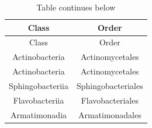 \documentclass[]{article}
\begin{document}
\begin{longtable}[]{@{}cc@{}}
\caption{Table continues below}\tabularnewline
\toprule
\begin{minipage}[b]{0.38\columnwidth}\centering\strut
Class\strut
\end{minipage} & \begin{minipage}[b]{0.44\columnwidth}\centering\strut
Order\strut
\end{minipage}\tabularnewline
\midrule
\endfirsthead
\toprule
\begin{minipage}[b]{0.38\columnwidth}\centering\strut
Class\strut
\end{minipage} & \begin{minipage}[b]{0.44\columnwidth}\centering\strut
Order\strut
\end{minipage}\tabularnewline
\midrule
\endhead
\begin{minipage}[t]{0.38\columnwidth}\centering\strut
Actinobacteria\strut
\end{minipage} & \begin{minipage}[t]{0.44\columnwidth}\centering\strut
Actinomycetales\strut
\end{minipage}\tabularnewline
\begin{minipage}[t]{0.38\columnwidth}\centering\strut
Actinobacteria\strut
\end{minipage} & \begin{minipage}[t]{0.44\columnwidth}\centering\strut
Actinomycetales\strut
\end{minipage}\tabularnewline
\begin{minipage}[t]{0.38\columnwidth}\centering\strut
Sphingobacteriia\strut
\end{minipage} & \begin{minipage}[t]{0.44\columnwidth}\centering\strut
Sphingobacteriales\strut
\end{minipage}\tabularnewline
\begin{minipage}[t]{0.38\columnwidth}\centering\strut
Flavobacteriia\strut
\end{minipage} & \begin{minipage}[t]{0.44\columnwidth}\centering\strut
Flavobacteriales\strut
\end{minipage}\tabularnewline
\begin{minipage}[t]{0.38\columnwidth}\centering\strut
Armatimonadia\strut
\end{minipage} & \begin{minipage}[t]{0.44\columnwidth}\centering\strut
Armatimonadales\strut
\end{minipage}\tabularnewline

\end{longtable}
\end{document}
